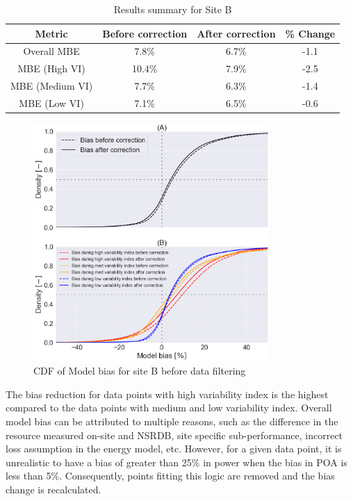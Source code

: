 \documentclass[conference]{IEEEtran}
\begin{document}
\begin{table}[htbp]
\caption{Results summary for Site B}
\begin{center}
\begin{tabular}{ |c|c|c|c| } 
\hline
Metric & Before correction & After correction & \% Change\\
\hline
Overall MBE & 7.8\% & 6.7\% & -1.1\\
\hline
MBE (High VI) & 10.4\% & 7.9\% & -2.5\\
\hline
MBE (Medium VI) & 7.7\% & 6.3\% & -1.4\\
\hline
MBE (Low VI) & 7.1\% & 6.5\% & -0.6\\

\hline
\end{tabular}
\end{center}
\label{table3}
\end{table}

\begin{figure}[htbp]
\centerline{\includegraphics[width=9cm]{PAW_ModelBias_breakdown_CDF_v3.png}}
\caption{CDF of Model bias for site B before data filtering}
\label{fig:PAW-modelbias-cdf}
\end{figure}

The bias reduction for data points with high variability index is the highest compared to the data points with medium and low variability index. Overall model bias can be attributed to multiple reasons, such as the difference in the resource measured on-site and NSRDB, site specific sub-performance, incorrect loss assumption in the energy model, etc. However, for a given data point, it is unrealistic to have a bias of greater than 25\% in power when the bias in POA is less than 5\%. Consequently, points fitting this logic are removed and the bias change is recalculated.
\end{document}
